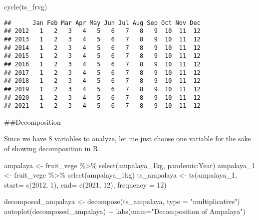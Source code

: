 \documentclass[
]{article}
\newenvironment{Shaded}{\begin{snugshade}}{\end{snugshade}}
\newcommand{\AttributeTok}[1]{\textcolor[rgb]{0.77,0.63,0.00}{#1}}
\newcommand{\DecValTok}[1]{\textcolor[rgb]{0.00,0.00,0.81}{#1}}
\newcommand{\FunctionTok}[1]{\textcolor[rgb]{0.00,0.00,0.00}{#1}}
\newcommand{\NormalTok}[1]{#1}
\newcommand{\OtherTok}[1]{\textcolor[rgb]{0.56,0.35,0.01}{#1}}
\newcommand{\SpecialCharTok}[1]{\textcolor[rgb]{0.00,0.00,0.00}{#1}}
\newcommand{\StringTok}[1]{\textcolor[rgb]{0.31,0.60,0.02}{#1}}
\begin{document}
\begin{Shaded}
\begin{Highlighting}[]
\FunctionTok{cycle}\NormalTok{(ts\_frvg)}
\end{Highlighting}
\end{Shaded}

\begin{verbatim}
##      Jan Feb Mar Apr May Jun Jul Aug Sep Oct Nov Dec
## 2012   1   2   3   4   5   6   7   8   9  10  11  12
## 2013   1   2   3   4   5   6   7   8   9  10  11  12
## 2014   1   2   3   4   5   6   7   8   9  10  11  12
## 2015   1   2   3   4   5   6   7   8   9  10  11  12
## 2016   1   2   3   4   5   6   7   8   9  10  11  12
## 2017   1   2   3   4   5   6   7   8   9  10  11  12
## 2018   1   2   3   4   5   6   7   8   9  10  11  12
## 2019   1   2   3   4   5   6   7   8   9  10  11  12
## 2020   1   2   3   4   5   6   7   8   9  10  11  12
## 2021   1   2   3   4   5   6   7   8   9  10  11  12
\end{verbatim}

\#\#Decomposition

Since we have 8 variables to analyze, let me just choose one variable
for the sake of showing decomposition in R.

\begin{Shaded}
\begin{Highlighting}[]
\NormalTok{ampalaya }\OtherTok{\textless{}{-}}\NormalTok{ fruit\_vege }\SpecialCharTok{\%\textgreater{}\%} \FunctionTok{select}\NormalTok{(ampalaya\_1kg, pandemic}\SpecialCharTok{:}\NormalTok{Year)}
\NormalTok{ampalaya\_1 }\OtherTok{\textless{}{-}}\NormalTok{ fruit\_vege }\SpecialCharTok{\%\textgreater{}\%} \FunctionTok{select}\NormalTok{(ampalaya\_1kg)}
\NormalTok{ts\_ampalaya }\OtherTok{\textless{}{-}} \FunctionTok{ts}\NormalTok{(ampalaya\_1, }\AttributeTok{start=} \FunctionTok{c}\NormalTok{(}\DecValTok{2012}\NormalTok{, }\DecValTok{1}\NormalTok{), }\AttributeTok{end=} \FunctionTok{c}\NormalTok{(}\DecValTok{2021}\NormalTok{, }\DecValTok{12}\NormalTok{), }\AttributeTok{frequency =} \DecValTok{12}\NormalTok{)}
\end{Highlighting}
\end{Shaded}

\begin{Shaded}
\begin{Highlighting}[]
\NormalTok{decomposed\_ampalaya }\OtherTok{\textless{}{-}} \FunctionTok{decompose}\NormalTok{(ts\_ampalaya, }\AttributeTok{type =} \StringTok{"multiplicative"}\NormalTok{)}
\FunctionTok{autoplot}\NormalTok{(decomposed\_ampalaya) }\SpecialCharTok{+} \FunctionTok{labs}\NormalTok{(}\AttributeTok{main=}\StringTok{"Decomposition of Ampalaya"}\NormalTok{)}
\end{Highlighting}
\end{Shaded}
\end{document}
